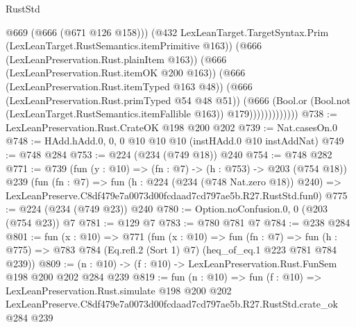 \begin{lexlean}{RustStd}
\begin{coremodule}
                            @669
                            (@666 (@671 @126 @158)))
                          (@432
                            LexLeanTarget.TargetSyntax.Prim
                            (LexLeanTarget.RustSemantics.itemPrimitive @163))
                          (@666 (LexLeanPreservation.Rust.plainItem @163))
                          (@666 (LexLeanPreservation.Rust.itemOK @200 @163))
                          (@666 (LexLeanPreservation.Rust.itemTyped @163 @48))
                          (@666 (LexLeanPreservation.Rust.primTyped @54 @48 @51))
                          (@666
                            (Bool.or
                              (Bool.not (LexLeanTarget.RustSemantics.itemFallible @163))
                              @179)))))))))))))
@738 := LexLeanPreservation.Rust.CrateOK @198 @200 @202
@739 := Nat.casesOn.{0}
@748 := HAdd.hAdd.{0, 0, 0} @10 @10 @10 (instHAdd.{0} @10 instAddNat)
@749 := @748 @284
@753 := @224 (@234 (@749 @18)) @240
@754 := @748 @282
@771 := @739
    (fun (y : @10) => (fn : @7) -> (h : @753) -> @203 (@754 @18))
    @239
    (fun (fn : @7) =>
    fun (h : @224 (@234 (@748 Nat.zero @18)) @240) =>
    LexLeanPreserve.C8df479e7a0073d00fcdaad7cd797ae5b.R27.RustStd.fun0)
@775 := @224 (@234 (@749 @23)) @240
@780 := Option.noConfusion.{0, 0} (@203 (@754 @23)) @7
@781 := @129 @7
@783 := @780 @781 @7
@784 := @238 @284
@801 := fun (x : @10) =>
  @771
    (fun (x : @10) =>
    fun (fn : @7) =>
    fun (h : @775) => @783 @784 (Eq.refl.{2} (Sort 1) @7) (heq_of_eq.{1} @223 @781 @784 @239))
@809 := (n : @10) -> (f : @10) -> LexLeanPreservation.Rust.FunSem @198 @200 @202 @284 @239
@819 := fun (n : @10) =>
  fun (f : @10) =>
  LexLeanPreservation.Rust.simulate
    @198
    @200
    @202
    LexLeanPreserve.C8df479e7a0073d00fcdaad7cd797ae5b.R27.RustStd.crate_ok
    @284
    @239
\end{coremodule}
\end{lexlean}
